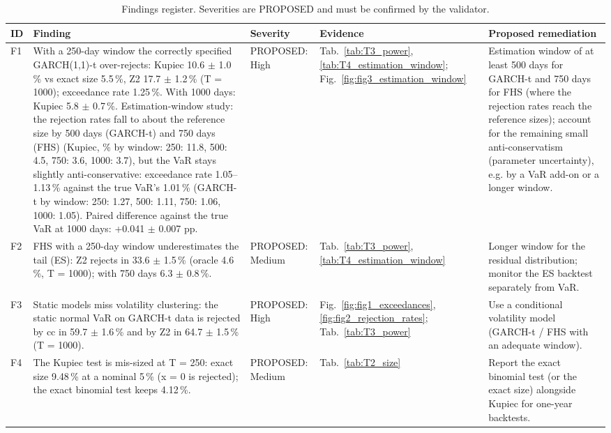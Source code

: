 \begin{table}[H]
\centering
\scriptsize
\caption{Findings register. Severities are PROPOSED and must be confirmed by the validator.}
\label{tab:T7_findings}
\begin{tabular}{>{\raggedright\arraybackslash}p{0.5cm}>{\raggedright\arraybackslash}p{5.2cm}>{\raggedright\arraybackslash}p{1.8cm}>{\raggedright\arraybackslash}p{2.7cm}>{\raggedright\arraybackslash}p{3.5cm}}
\toprule
ID & Finding & Severity & Evidence & Proposed remediation \\
\midrule
F1 & With a 250-day window the correctly specified GARCH(1,1)-t over-rejects: Kupiec 10.6 $\pm$ 1.0\,\% vs exact size 5.5\,\%, Z2 17.7 $\pm$ 1.2\,\% (T = 1000); exceedance rate 1.25\,\%. With 1000 days: Kupiec 5.8 $\pm$ 0.7\,\%. Estimation-window study: the rejection rates fall to about the reference size by 500 days (GARCH-t) and 750 days (FHS) (Kupiec, \% by window: 250: 11.8, 500: 4.5, 750: 3.6, 1000: 3.7), but the VaR stays slightly anti-conservative: exceedance rate 1.05--1.13\,\% against the true VaR's 1.01\,\% (GARCH-t by window: 250: 1.27, 500: 1.11, 750: 1.06, 1000: 1.05). Paired difference against the true VaR at 1000 days: +0.041 $\pm$ 0.007 pp. & PROPOSED: High & Tab.~\ref{tab:T3_power}, \ref{tab:T4_estimation_window}; Fig.~\ref{fig:fig3_estimation_window} & Estimation window of at least 500 days for GARCH-t and 750 days for FHS (where the rejection rates reach the reference sizes); account for the remaining small anti-conservatism (parameter uncertainty), e.g. by a VaR add-on or a longer window. \\
F2 & FHS with a 250-day window underestimates the tail (ES): Z2 rejects in 33.6 $\pm$ 1.5\,\% (oracle 4.6\,\%, T = 1000); with 750 days 6.3 $\pm$ 0.8\,\%. & PROPOSED: Medium & Tab.~\ref{tab:T3_power}, \ref{tab:T4_estimation_window} & Longer window for the residual distribution; monitor the ES backtest separately from VaR. \\
F3 & Static models miss volatility clustering: the static normal VaR on GARCH-t data is rejected by cc in 59.7 $\pm$ 1.6\,\% and by Z2 in 64.7 $\pm$ 1.5\,\% (T = 1000). & PROPOSED: High & Fig.~\ref{fig:fig1_exceedances}, \ref{fig:fig2_rejection_rates}; Tab.~\ref{tab:T3_power} & Use a conditional volatility model (GARCH-t / FHS with an adequate window). \\
F4 & The Kupiec test is mis-sized at T = 250: exact size 9.48\,\% at a nominal 5\,\% (x = 0 is rejected); the exact binomial test keeps 4.12\,\%. & PROPOSED: Medium & Tab.~\ref{tab:T2_size} & Report the exact binomial test (or the exact size) alongside Kupiec for one-year backtests. \\

\end{tabular}
\end{table}
